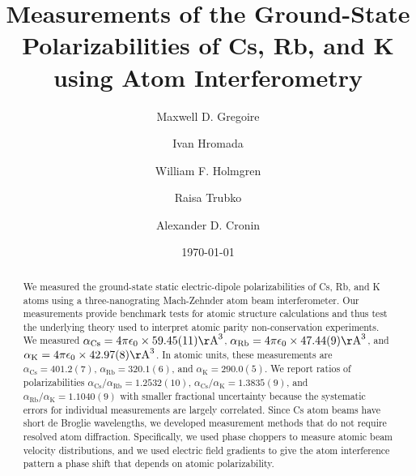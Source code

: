 \documentclass[twocolumn,pra,showpacs,superscriptaddress,longbibliography]{revtex4-1}   %
\newcommand{\ak}{\alpha_{\textrm{K}}}
\newcommand{\arb}{\alpha_{\textrm{Rb}}}
\newcommand{\acs}{\alpha_{\textrm{Cs}}}
\newcommand{\polKSysOnly}{42.97(8)}
\newcommand{\polRbSysOnly}{47.44(9)}
\newcommand{\polCsSysOnly}{59.45(11)}
\newcommand{\ratRbK}{1.1040(9)}
\newcommand{\ratCsK}{1.3835(9)}
\newcommand{\ratCsRb}{1.2532(10)}
\newcommand{\AAA}{\mathrm{\AA}}
\begin{document}
\title{Measurements of the Ground-State Polarizabilities of Cs, Rb, and K using Atom Interferometry}

\author{Maxwell D. Gregoire}
\author{Ivan Hromada}
\author{William F. Holmgren}
\author{Raisa Trubko}
\author{Alexander D. Cronin}

\date{\today}





\begin{abstract}
We measured the ground-state static electric-dipole polarizabilities of Cs, Rb, and K atoms using a three-nanograting Mach-Zehnder atom beam interferometer. Our measurements provide benchmark tests for atomic structure calculations and thus test the underlying theory used to interpret atomic parity non-conservation experiments.
We measured $\acs = 4\pi\epsilon_0 \times \polCsSysOnly \AAA^3$, $\arb = 4\pi\epsilon_0 \times \polRbSysOnly \AAA^3$, and $\ak = 4\pi\epsilon_0 \times \polKSysOnly \AAA^3$. In atomic units, these measurements are $\acs = 401.2(7)$, $\arb = 320.1(6)$, and $\ak = 290.0(5)$. We report ratios of polarizabilities $\acs/\arb = \ratCsRb$, $\acs/\ak = \ratCsK$, and $\arb/\ak = \ratRbK$ with smaller fractional uncertainty because the systematic errors for individual measurements are largely correlated. 
Since Cs atom beams have short de Broglie wavelengths, we developed measurement methods that do not require resolved atom diffraction.
Specifically, we used phase choppers to measure atomic beam velocity distributions, and we used electric field gradients to give the atom interference pattern a phase shift that depends on atomic polarizability.
\end{abstract}
\end{document}
